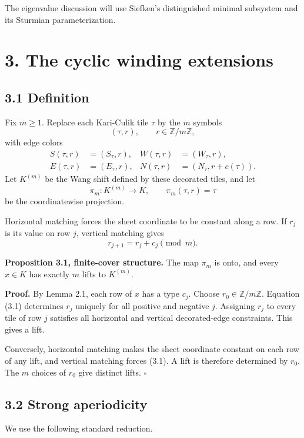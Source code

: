 \documentclass[11pt]{article}
\begin{document}
The eigenvalue discussion will use Siefken's distinguished minimal
subsystem and its Sturmian parameterization.

\section*{3. The cyclic winding extensions}

\subsection*{3.1 Definition}

Fix \(m\geq 1\). Replace each Kari-Culik tile \(\tau\) by the \(m\) symbols
\[
  (\tau,r),\qquad r\in\mathbb Z/m\mathbb Z,
\]
with edge colors
\[
\begin{aligned}
 S(\tau,r)&=(S_\tau,r),&
 W(\tau,r)&=(W_\tau,r),\\
 E(\tau,r)&=(E_\tau,r),&
 N(\tau,r)&=(N_\tau,r+c(\tau)).
\end{aligned}
\]
Let \(K^{(m)}\) be the Wang shift defined by these decorated tiles, and let
\[
  \pi_m:K^{(m)}\longrightarrow K,\qquad
  \pi_m(\tau,r)=\tau
\]
be the coordinatewise projection.

Horizontal matching forces the sheet coordinate to be constant along a row.
If \(r_j\) is its value on row \(j\), vertical matching gives
\[
  r_{j+1}=r_j+c_j\pmod m.
  \tag{3.1}
\]

\textbf{Proposition 3.1, finite-cover structure.} The map \(\pi_m\) is onto, and
every \(x\in K\) has exactly \(m\) lifts to \(K^{(m)}\).

\textbf{Proof.} By Lemma 2.1, each row of \(x\) has a type \(c_j\). Choose
\(r_0\in\mathbb Z/m\mathbb Z\). Equation (3.1) determines \(r_j\) uniquely
for all positive and negative \(j\). Assigning \(r_j\) to every tile of row
\(j\) satisfies all horizontal and vertical decorated-edge constraints.
This gives a lift.

Conversely, horizontal matching makes the sheet coordinate constant on each
row of any lift, and vertical matching forces (3.1). A lift is therefore
determined by \(r_0\). The \(m\) choices of \(r_0\) give distinct lifts.
\(\square\)

\subsection*{3.2 Strong aperiodicity}

We use the following standard reduction.
\end{document}
